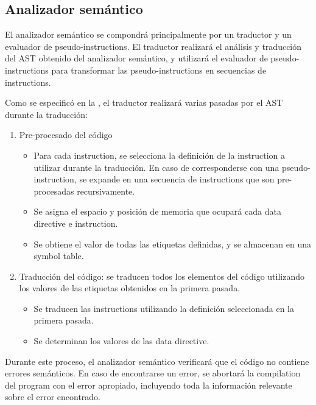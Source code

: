 \subsection{Analizador semántico}

El analizador semántico se compondrá principalmente por un traductor y un
evaluador de \glspl{pseudo-instruction}. El traductor realizará el análisis y
traducción del \gls{AST} obtenido del analizador semántico, y utilizará el
evaluador de \glspl{pseudo-instruction} para transformar las
\glspl{pseudo-instruction} en secuencias de \glspl{instruction}.

Como se especificó en la , el traductor realizará varias
pasadas por el \gls{AST} durante la traducción:

\begin{enumerate}
    \item Pre-procesado del código
    \begin{itemize}
        \item Para cada \gls{instruction}, se selecciona la definición de la
        \gls{instruction} a utilizar durante la traducción. En caso de
        corresponderse con una \gls{pseudo-instruction}, se expande en una
        secuencia de \glspl{instruction} que son pre-procesadas recursivamente.
        \item Se asigna el espacio y posición de memoria que ocupará cada
        \gls{data directive} e \gls{instruction}.
        \item Se obtiene el valor de todas las etiquetas definidas,
        y se almacenan en una \gls{symbol table}.
    \end{itemize}
    \item Traducción del código: se traducen todos los elementos del código
    utilizando los valores de las etiquetas obtenidos en la primera pasada.
    \begin{itemize}
        \item Se traducen las \glspl{instruction} utilizando la definición
        seleccionada en la primera pasada.
        \item Se determinan los valores de las \gls{data directive}.
    \end{itemize}
\end{enumerate}

Durante este proceso, el analizador semántico verificará que el código no
contiene errores semánticos. En caso de encontrarse un error, se abortará la
\gls{compilation} del \gls{program} con el error apropiado, incluyendo toda la
información relevante sobre el error encontrado.
